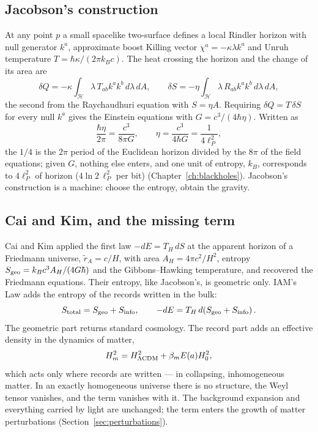 \subsection{Jacobson's construction}
At any point $p$ a small spacelike two-surface defines a local Rindler horizon with null generator $k^a$, approximate boost Killing vector
$\chi^a=-\kappa\lambda k^a$ and Unruh temperature $T=\hbar\kappa/(2\pi k_Bc)$. The heat crossing the horizon and the change of its area are
\begin{equation}
\delta Q=-\kappa\int_{\mathcal H}\lambda\,T_{ab}k^ak^b\,d\lambda\,dA,\qquad
\delta S=-\eta\int_{\mathcal H}\lambda\,R_{ab}k^ak^b\,d\lambda\,dA,
\end{equation}
the second from the Raychaudhuri equation with $S=\eta A$. Requiring $\delta Q=T\,\delta S$ for every null $k^a$ gives the Einstein equations with
$G=c^3/(4\hbar\eta)$. Written as
\begin{equation}
\frac{\hbar\eta}{2\pi}=\frac{c^3}{8\pi G},\qquad \eta=\frac{c^3}{4\hbar G}=\frac{1}{4\ell_P^2},
\end{equation}
the $1/4$ is the $2\pi$ period of the Euclidean horizon divided by the $8\pi$ of the field equations; given $G$, nothing else enters, and one unit of entropy, $k_B$,
corresponds to $4\ell_P^2$ of horizon ($4\ln2\,\ell_P^2$ per bit) (Chapter~\ref{ch:blackholes}). Jacobson's construction is a machine: choose the entropy, obtain the gravity.

\subsection{Cai and Kim, and the missing term}
Cai and Kim applied the first law $-dE=T_H\,dS$ at the apparent horizon of a Friedmann universe, $\tilde r_A=c/H$, with area $A_H=4\pi c^2/H^2$, entropy
$S_{\rm geo}=k_Bc^3A_H/(4G\hbar)$ and the Gibbons--Hawking temperature, and recovered the Friedmann equations. Their entropy, like Jacobson's, is geometric
only. IAM's Law adds the entropy of the records written in the bulk:
\begin{equation}
S_{\rm total}=S_{\rm geo}+S_{\rm info},\qquad -dE=T_H\,d\!\left(S_{\rm geo}+S_{\rm info}\right). \label{eq:firstlaw}
\end{equation}
The geometric part returns standard cosmology. The record part adds an effective density in the dynamics of matter,
\begin{equation}
H_m^2=H_{\Lambda{\rm CDM}}^2+\beta_mE(a)H_0^2 , \label{eq:Hm}
\end{equation}
which acts only where records are written --- in collapsing, inhomogeneous matter. In an exactly homogeneous universe there is no structure, the Weyl tensor
vanishes, and the term vanishes with it. The background expansion and everything carried by light are unchanged; the term enters the growth of matter
perturbations (Section~\ref{sec:perturbations}).


